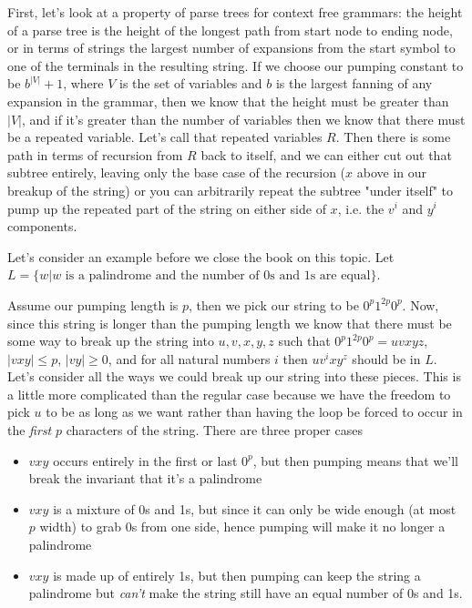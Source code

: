 \documentclass[11pt]{article}
\begin{document}
First, let's look at a property of parse trees for context free grammars: the height of a parse tree is the height of the longest path from start node to ending node, or in terms of strings the largest number of expansions from the start symbol to one of the terminals in the resulting string. If we choose our pumping constant to be $b^{|V|} + 1$, where $V$ is the set of variables and $b$ is the largest fanning of any expansion in the grammar, then we know that the height must be greater than $|V|$, and if it's greater than the number of variables then we know that there must be a repeated variable. Let's call that repeated variables $R$. Then there is some path in terms of recursion from $R$ back to itself, and we can either cut out that subtree entirely, leaving only the base case of the recursion ($x$ above in our breakup of the string) or you can arbitrarily repeat the subtree "under itself" to pump up the repeated part of the string on either side of $x$, i.e. the $v^i$ and $y^i$ components. 

Let's consider an example before we close the book on this topic. Let $L = \{ w | w \text{ is a palindrome and the number of 0s and 1s are equal}\}$.

Assume our pumping length is $p$, then we pick our string to be $0^p1^{2p}0^p$. Now, since this string is longer than the pumping length we know that there must be some way to break up the string into $u,v,x,y,z$ such that $0^p1^{2p}0^p = uvxyz$, $|vxy| \le p$, $|vy| \ge 0$, and for all natural numbers $i$ then $uv^ixy^z$ should be in $L$. Let's consider all the ways we could break up our string into these pieces. This is a little more complicated than the regular case because we have the freedom to pick $u$ to be as long as we want rather than having the loop be forced to occur in the \emph{first} $p$ characters of the string. There are three proper cases

\begin{itemize}
\item $vxy$ occurs entirely in the first or last $0^p$, but then pumping means that we'll break the invariant that it's a palindrome
\item $vxy$ is a mixture of 0s and 1s, but since it can only be wide enough (at most $p$ width) to grab 0s from one side, hence pumping will make it no longer a palindrome
\item $vxy$ is made up of entirely 1s, but then pumping can keep the string a palindrome but \emph{can't} make the string still have an equal number of 0s and 1s.
\end{itemize}
\end{document}

